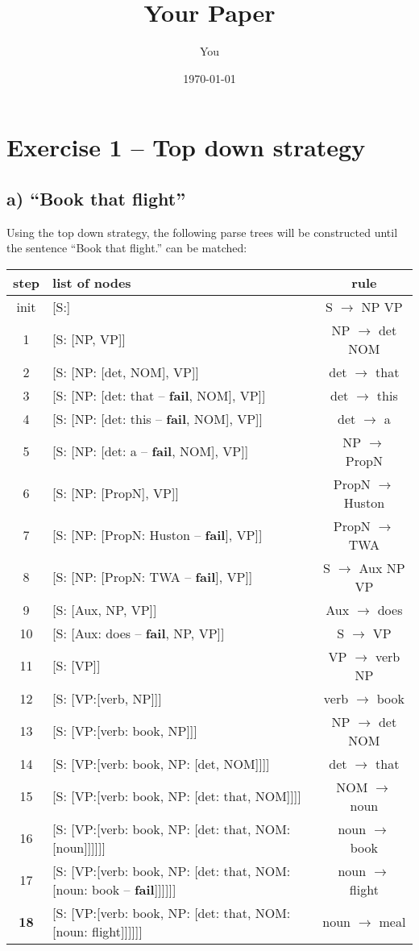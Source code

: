 \documentclass[a4paper]{article}
\title{Your Paper}
\author{You}
\date{\today}
\newcommand{\ra}{$\rightarrow$ }
\newcommand{\f}{-- \textbf{fail}}
\begin{document}
\section*{Exercise 1 -- Top down strategy}
\subsection*{a) ``Book that flight''}
Using the top down strategy, the following parse trees will be constructed until the sentence ``Book that flight.'' can be matched:

\vspace{3mm}
\begin{tabular}{| c | l | c |}
\hline 
\textbf{step} & \textbf{list of nodes} & \textbf{rule}  \\ \hline
init & [S:] & S \ra NP VP \\
1 & [S: [NP, VP]] & NP \ra det NOM \\
2 & [S: [NP: [det, NOM], VP]] & det \ra that \\
3 & [S: [NP: [det: that \f, NOM], VP]] & det \ra this \\
4 & [S: [NP: [det: this \f, NOM], VP]] & det \ra a \\
5 & [S: [NP: [det: a \f, NOM], VP]] & NP \ra PropN \\
6 & [S: [NP: [PropN], VP]] & PropN \ra Huston \\
7 & [S: [NP: [PropN: Huston \f], VP]] & PropN \ra TWA \\
8 & [S: [NP: [PropN: TWA \f], VP]] & S \ra Aux NP VP \\
9 & [S: [Aux, NP, VP]] & Aux \ra does \\
10 & [S: [Aux: does \f, NP, VP]] & S \ra VP \\
11 & [S: [VP]] & VP \ra verb NP \\
12 & [S: [VP:[verb, NP]]] & verb \ra book \\
13 & [S: [VP:[verb: book, NP]]] & NP \ra det NOM \\
14 & [S: [VP:[verb: book, NP: [det, NOM]]]] & det \ra that \\
15 & [S: [VP:[verb: book, NP: [det: that, NOM]]]] & NOM \ra noun \\
16 & [S: [VP:[verb: book, NP: [det: that, NOM:[noun]]]]]] & noun \ra book \\
17 & [S: [VP:[verb: book, NP: [det: that, NOM:[noun: book \f]]]]]] & noun \ra flight \\
\textbf{18} & [S: [VP:[verb: book, NP: [det: that, NOM:[noun: flight]]]]]] & noun \ra meal \\
\hline
\end{tabular}
\end{document}
